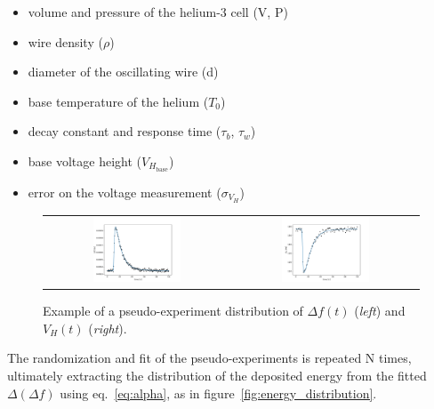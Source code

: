\documentclass[a4paper,12pt]{article}
\begin{document}
\begin{itemize}
  \item volume and pressure of the helium-3 cell (V, P)
  \item wire density ($\rho$)
  \item diameter of the oscillating wire (d)
  \item base temperature of the helium ($T_0$)
  \item decay constant and response time ($\tau_b$, $\tau_w$)
  \item base voltage height ($V_{H_\mathrm{base}}$)
  \item error on the voltage measurement ($\sigma_{V_H}$)
\end{itemize}

\begin{figure}[!ht]
  \begin{center}
    \begin{tabular}{cc}
    \includegraphics[width=0.49\textwidth]{deltaf_toy-example} &
    \includegraphics[width=0.49\textwidth]{voltage_toy-example}
    \end{tabular}
    \caption{Example of a pseudo-experiment distribution of $\Delta f(t)$ (\textit{left}) and $V_H(t)$ (\textit{right}).}
    \label{fig:toy}
  \end{center}
\end{figure}

The randomization and fit of the pseudo-experiments is repeated N times, ultimately extracting the distribution of the deposited energy from the fitted $\Delta(\Delta f)$ using eq.~\ref{eq:alpha}, as in figure~\ref{fig:energy_distribution}.
\end{document}
